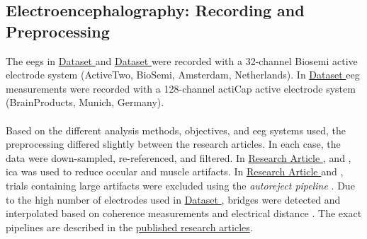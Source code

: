 \subsection{Electroencephalography: Recording and Preprocessing}
The \glspl{eeg} in \hyperref[methods:datasets:I]{Dataset } and \hyperref[methods:datasets:II]{Dataset } were recorded with a 32-channel Biosemi active electrode system (ActiveTwo, BioSemi, Amsterdam, Netherlands). In \hyperref[methods:datasets:III]{Dataset } \gls{eeg} measurements were recorded with a 128-channel actiCap active electrode system (BrainProducts, Munich, Germany).\\
\\
Based on the different analysis methods, objectives, and \gls{eeg} systems used, the preprocessing differed slightly between the research articles. In each case, the data were down-sampled, re-referenced, and filtered. In \hyperref[results:paperI]{Research Article }, \hyperref[results:paperIII]{} and \hyperref[results:paperIV]{}, \gls{ica} was used to reduce occular and muscle artifacts. In \hyperref[results:paperI]{Research Article } and \hyperref[results:paperIV]{}, trials containing large artifacts were excluded using the \textit{autoreject pipeline} \cite{Jas2017}. Due to the high number of electrodes used in \hyperref[methods:datasets:III]{Dataset }, bridges were detected and interpolated based on coherence measurements and electrical distance \cite{Alschuler2014}. The exact pipelines are described in the \hyperref[pub:papers]{published research articles}.  

